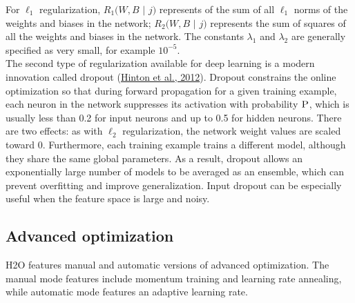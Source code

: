 For $\ell_1$ regularization, $R_1(W,B$ $|$ $j)$ represents of the sum of all $\ell_1$ norms of the weights and biases in the network; $R_2(W,B$ $|$ $j)$ represents the sum of squares of all the weights and biases in the network. The constants $\lambda_1$ and $\lambda_2$ are generally specified as very small, for example $10^{-5}$.
\\

The second type of regularization available for deep learning is a modern innovation called dropout (\href{http://arxiv.org/pdf/1207.0580.pdf}{Hinton et al., 2012}). %
Dropout constrains the online optimization so that during forward propagation for a given training example, each neuron in the network suppresses its activation with probability $\textsc{P}$, which is usually less than 0.2 for input neurons and up to 0.5 for hidden neurons. There are two effects: as with $\ell_2$ regularization, the network weight values are scaled toward 0. Furthermore, each training example trains a different model, although they share the same global parameters. As a result, dropout allows an exponentially large number of models to be averaged as an ensemble, which can prevent overfitting and improve generalization. Input dropout can be especially useful when the feature space is large and noisy.

\subsection{Advanced optimization} 
H2O features manual and automatic versions of advanced optimization. The manual mode features include momentum training and learning rate annealing, while automatic mode features an adaptive learning rate.

